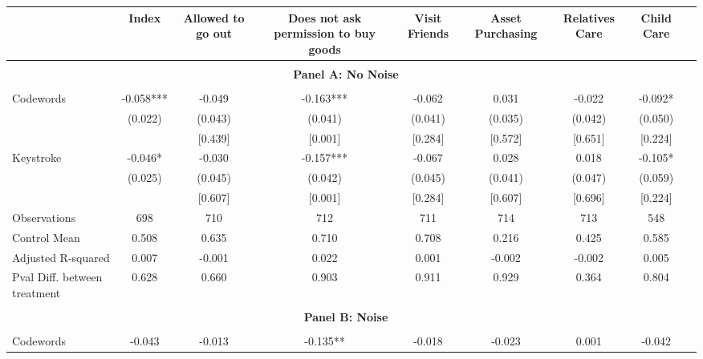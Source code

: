 \begin{tabular}{l*{8}{c}} \hline\hline
                    &\multicolumn{1}{c}{Index}&\multicolumn{1}{c}{Allowed to go out}&\multicolumn{1}{c}{Does not ask permission to buy goods}&\multicolumn{1}{c}{Visit Friends}&\multicolumn{1}{c}{Asset Purchasing}&\multicolumn{1}{c}{Relatives Care}&\multicolumn{1}{c}{Child Care}\\
\hline \\ \multicolumn{8}{c}{\textbf{Panel A: No Noise}} \\\\[-1ex]
Codewords           &      -0.058***&      -0.049   &      -0.163***&      -0.062   &       0.031   &      -0.022   &      -0.092*  \\
                    &     (0.022)   &     (0.043)   &     (0.041)   &     (0.041)   &     (0.035)   &     (0.042)   &     (0.050)   \\
                    &               &     [0.439]   &     [0.001]   &     [0.284]   &     [0.572]   &     [0.651]   &     [0.224]   \\
Keystroke           &      -0.046*  &      -0.030   &      -0.157***&      -0.067   &       0.028   &       0.018   &      -0.105*  \\
                    &     (0.025)   &     (0.045)   &     (0.042)   &     (0.045)   &     (0.041)   &     (0.047)   &     (0.059)   \\
                    &               &     [0.607]   &     [0.001]   &     [0.284]   &     [0.607]   &     [0.696]   &     [0.224]   \\
\hline
Observations        &         698   &         710   &         712   &         711   &         714   &         713   &         548   \\
Control Mean        &       0.508   &       0.635   &       0.710   &       0.708   &       0.216   &       0.425   &       0.585   \\
Adjusted R-squared  &       0.007   &      -0.001   &       0.022   &       0.001   &      -0.002   &      -0.002   &       0.005   \\
Pval Diff. between treatment&       0.628   &       0.660   &       0.903   &       0.911   &       0.929   &       0.364   &       0.804   \\
\hline \\ \multicolumn{8}{c}{\textbf{Panel B: Noise}} \\\\[-1ex]
Codewords           &      -0.043   &      -0.013   &      -0.135** &      -0.018   &      -0.023   &       0.001   &      -0.042   \\

\end{tabular}

